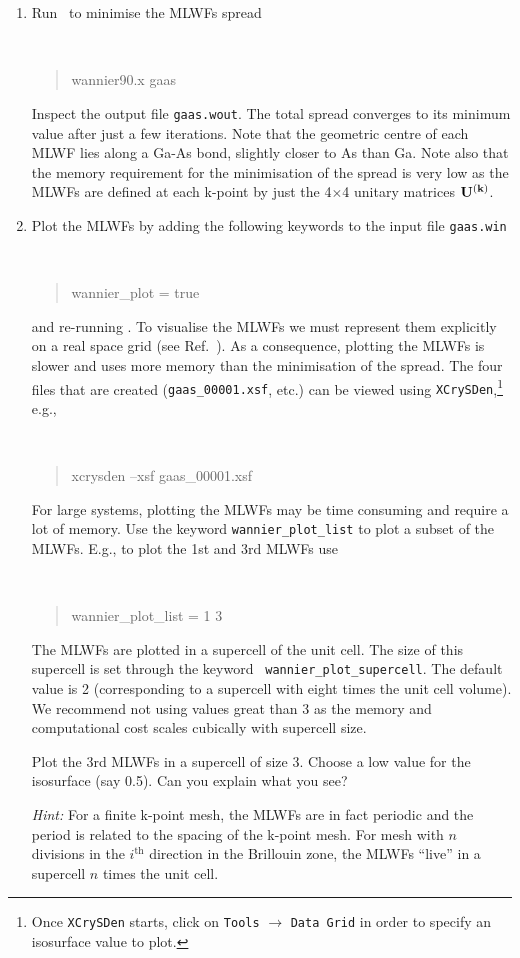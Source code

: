 \documentclass[a4paper,11pt,twoside]{article}
\begin{document}
\begin{enumerate}
\item Run \wannier\ to minimise the MLWFs spread
{\tt
\begin{quote}
wannier90.x gaas
\end{quote} }
Inspect the output file {\tt gaas.wout}. The total spread converges to its
minimum value after just a few iterations. Note that the geometric centre of
each MLWF lies along a Ga-As bond, slightly closer to As
than Ga. Note also that the memory requirement for the minimisation of
the spread is very low as the MLWFs are defined at each
k-point by just the 4$\times$4 unitary matrices $\mathbf{U}^{(\mathbf{k})}$. 
\item Plot the MLWFs by adding the following keywords to
  the input file {\tt gaas.win} 
{\tt
\begin{quote}
wannier\_\-plot = true
\end{quote} } and re-running \wannier. To visualise the MLWFs we must
represent them explicitly on a real space grid (see
Ref.~\cite{UserGuide}). As a consequence, plotting the MLWFs is slower
and uses more memory than the minimisation of the spread. The four
files that are created ({\tt gaas\_00001.xsf}, etc.) can be viewed
using {\tt XCrySDen},\footnote{Once {\tt XCrySDen} starts, click on
  {\tt Tools} $\rightarrow$ {\tt Data Grid} in order to specify an
  isosurface value to plot.} e.g., {\tt
\begin{quote}
xcrysden --xsf gaas\_00001.xsf
\end{quote} }

For large systems, plotting the MLWFs may be time consuming
and require a lot of memory. Use the keyword {\tt wannier\_plot\_list}
to plot a subset of the MLWFs. E.g., to plot the
1st and 3rd MLWFs use 
{\tt
\begin{quote}
wannier\_plot\_list = 1 3
\end{quote} }
The MLWFs are plotted in a supercell of the unit cell. The
size of this supercell is set through the keyword {\tt
  wannier\_plot\_supercell}. The default value is 2 (corresponding to a
supercell with eight times the unit cell volume). We recommend not using
values great than 3 as the memory and computational cost scales
cubically with supercell size.  

Plot the 3rd MLWFs in a supercell of size 3. Choose a low
value for the isosurface (say 0.5). Can you explain what you see? 

{\it Hint:} For a finite k-point mesh, the MLWFs are in fact
periodic and the period is related to the spacing of the k-point mesh. For
mesh with $n$ divisions in the $i^{\mathrm{th}}$ direction in the
Brillouin zone, the MLWFs ``live'' in a supercell $n$ times the
unit cell. 
\end{enumerate}
\end{document}
